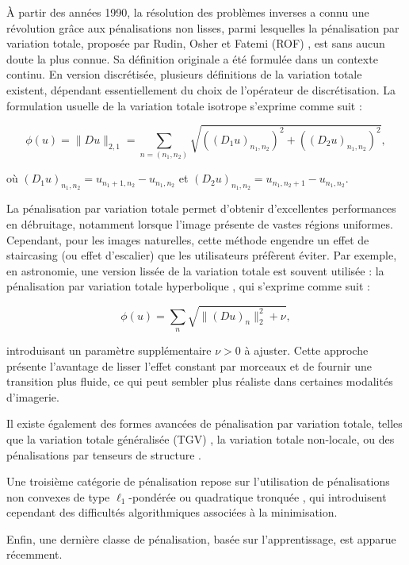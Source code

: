 \documentclass[a4paper, 12pt]{report} %
\begin{document}
À partir des années 1990, la résolution des problèmes inverses a connu une révolution grâce aux pénalisations non lisses, parmi lesquelles la pénalisation par variation totale, proposée par Rudin, Osher et Fatemi (ROF) \cite{rudin1992nonlinear}, est sans aucun doute la plus connue. Sa définition originale a été formulée dans un contexte continu. En version discrétisée, plusieurs définitions de la variation totale existent, dépendant essentiellement du choix de l’opérateur de discrétisation. La formulation usuelle de la variation totale isotrope s'exprime comme suit :

\[
\phi(u) = \|Du\|_{2,1}  = \sum_{n=(n_1,n_2)} \sqrt{((D_1 u)_{n_1,n_2})^2 + ((D_2 u)_{n_1,n_2})^2},
\]

où \((D_1 u)_{n_1,n_2} = u_{n_1+1,n_2} - u_{n_1,n_2}\) et \((D_2 u)_{n_1,n_2} = u_{n_1,n_2+1} - u_{n_1,n_2}\).

La pénalisation par variation totale permet d'obtenir d'excellentes performances en débruitage, notamment lorsque l'image présente de vastes régions uniformes. Cependant, pour les images naturelles, cette méthode engendre un effet de staircasing (ou effet d'escalier)   que les utilisateurs préfèrent éviter. Par exemple, en astronomie, une version lissée de la variation totale est souvent utilisée : la pénalisation par variation totale hyperbolique \cite{charbonnier1997deterministic}, qui s'exprime comme suit :

\[
\phi(u) = \sum_{n} \sqrt{ \| (Du)_n \|_2^2 + \nu},
\]

introduisant un paramètre supplémentaire \(\nu > 0\) à ajuster. Cette approche présente l'avantage de lisser l'effet constant par morceaux et de fournir une transition plus fluide, ce qui peut sembler plus réaliste dans certaines modalités d'imagerie.



Il existe également des formes avancées de pénalisation par variation totale, telles que la variation totale généralisée (TGV) \cite{bredies2010total}, la variation totale non-locale, ou des pénalisations par tenseurs de structure \cite{chierchia2014nonlocal}.

Une troisième catégorie de pénalisation repose sur l’utilisation de pénalisations non convexes de type \(\ell_1\)-pondérée ou quadratique tronquée \cite{nikolova2005analysis}, qui introduisent cependant des difficultés algorithmiques associées à la minimisation.

Enfin, une dernière classe de pénalisation, basée sur l'apprentissage, est apparue récemment.
\end{document}
